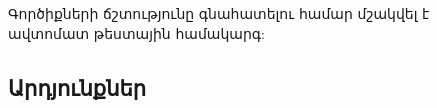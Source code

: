 {
	Գործիքների ճշտությունը գնահատելու համար մշակվել է ավտոմատ թեստային համակարգ:
	
	\subsection{Արդյունքներ}
}
